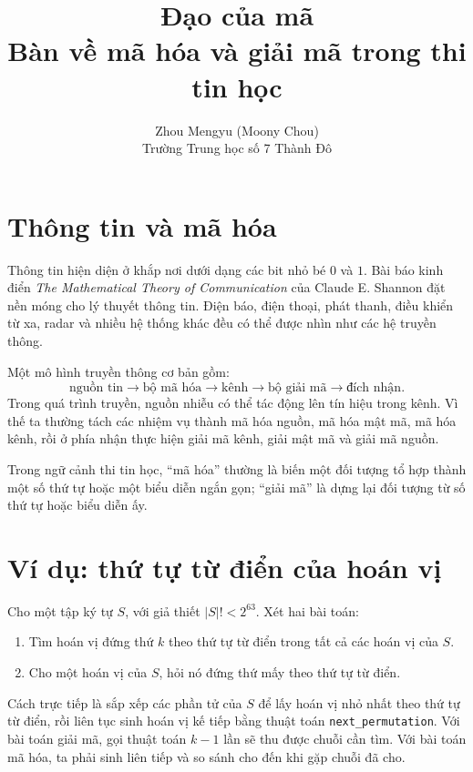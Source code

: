 \documentclass[11pt]{article}
\title{Đạo của mã\\{\large Bàn về mã hóa và giải mã trong thi tin học}}
\author{Zhou Mengyu (Moony Chou)\\Trường Trung học số 7 Thành Đô}
\date{}
\begin{document}
\maketitle


\section{Thông tin và mã hóa}

Thông tin hiện diện ở khắp nơi dưới dạng các bit nhỏ bé \(0\) và \(1\).
Bài báo kinh điển \emph{The Mathematical Theory of Communication} của
Claude E. Shannon đặt nền móng cho lý thuyết thông tin. Điện báo, điện
thoại, phát thanh, điều khiển từ xa, radar và nhiều hệ thống khác đều có
thể được nhìn như các hệ truyền thông.

Một mô hình truyền thông cơ bản gồm:
\[
  \text{nguồn tin}
  \longrightarrow
  \text{bộ mã hóa}
  \longrightarrow
  \text{kênh}
  \longrightarrow
  \text{bộ giải mã}
  \longrightarrow
  \text{đích nhận}.
\]
Trong quá trình truyền, nguồn nhiễu có thể tác động lên tín hiệu trong kênh.
Vì thế ta thường tách các nhiệm vụ thành mã hóa nguồn, mã hóa mật mã, mã hóa
kênh, rồi ở phía nhận thực hiện giải mã kênh, giải mật mã và giải mã nguồn.

Trong ngữ cảnh thi tin học, ``mã hóa'' thường là biến một đối tượng tổ hợp
thành một số thứ tự hoặc một biểu diễn ngắn gọn; ``giải mã'' là dựng lại đối
tượng từ số thứ tự hoặc biểu diễn ấy.

\section{Ví dụ: thứ tự từ điển của hoán vị}

Cho một tập ký tự \(S\), với giả thiết \(\lvert S\rvert! < 2^{63}\).
Xét hai bài toán:
\begin{enumerate}
  \item Tìm hoán vị đứng thứ \(k\) theo thứ tự từ điển trong tất cả các hoán
  vị của \(S\).
  \item Cho một hoán vị của \(S\), hỏi nó đứng thứ mấy theo thứ tự từ điển.
\end{enumerate}

Cách trực tiếp là sắp xếp các phần tử của \(S\) để lấy hoán vị nhỏ nhất theo
thứ tự từ điển, rồi liên tục sinh hoán vị kế tiếp bằng thuật toán
\texttt{next\_permutation}. Với bài toán giải mã, gọi thuật toán \(k-1\) lần
sẽ thu được chuỗi cần tìm. Với bài toán mã hóa, ta phải sinh liên tiếp và so
sánh cho đến khi gặp chuỗi đã cho.
\end{document}
